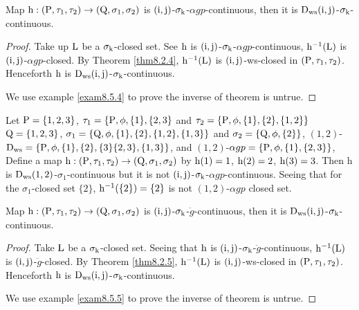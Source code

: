 \begin{thm}\label{thm8.5.4}
Map $\mathrm{h} :(\mathrm{P}, \tau_1, \tau_2 )\to (\mathrm{Q}, \sigma_{1}, \sigma_{2} )$ is $(\mathrm{i}, \mathrm{j})$-$\sigma_{\mathrm{k}}$-$\alpha gp$-continuous, then it is $\mathrm{D}_{\mathrm{ws}} (\mathrm{i}, \mathrm{j})$-$\sigma_{\mathrm{k}}$-continuous.
\end{thm}

\begin{proof}
Take up $\mathrm{L}$ be a $\sigma_{\mathrm{k}}$-closed set. See $\mathrm{h}$ is $(\mathrm{i}, \mathrm{j})$-$\sigma_{\mathrm{k}}$-$\alpha gp$-continuous, $\mathrm{h}^{-1} (\mathrm{L})$ is $(\mathrm{i}, \mathrm{j})$-$\alpha gp$-closed. By Theorem \ref{thm8.2.4}, $\mathrm{h}^{-1} (\mathrm{L})$ is $(\mathrm{i}, \mathrm{j})$-ws-closed in $(\mathrm{P}, \tau_1, \tau_2 )$. Henceforth $\mathrm{h}$ is $\mathrm{D}_{\mathrm{ws}} (\mathrm{i}, \mathrm{j})$-$\sigma_{\mathrm{k}}$-continuous.

We use example \ref{exam8.5.4} to prove the inverse of theorem is untrue.
\end{proof}

\begin{exm}\label{exam8.5.4}
Let $\mathrm{P}=\{1,2,3\}$, $\tau_1 =\{\mathrm{P}, \phi, \{1\},\{2,3\}$ and $\tau_2 =\{\TSP, \phi, \{1\},\{2\},\break \{1,2\}\}$ $\mathrm{Q}=\{1,2,3\}$, $\sigma_{1} =\{\mathrm{Q},\phi,\{1\},\{2\},\{1,2\},\{1,3\}\}$ and $\sigma_{2} =\{\mathrm{Q},\phi, \{2\}\}$, $(1,2)$-$\mathrm{D}_{\mathrm{ws}} =\{\mathrm{P}, \phi, \{1\},\{2\},\{3\}\{2,3\},\{1,3\}\}$, and $(1,2)$-$\alpha gp =\{\mathrm{P}, \phi, \{1\},\{2,3\}\}$, Define a map $\mathrm{h}: (\mathrm{P}, \tau_1, \tau_2 )\to (\mathrm{Q}, \sigma_{1}, \sigma_{2} )$ by $\mathrm{h}(1)=1$, $\mathrm{h}(2)=2$, $\mathrm{h}(3)=3$. Then h is $\mathrm{D}_{\mathrm{ws}} (1, 2)$-$\sigma_{1}$-continuous but it is not $(\mathrm{i}, \mathrm{j})$-$\sigma_{\mathrm{k}}$-$\alpha gp$-continuous. Seeing that for the $\sigma_{1}$-closed set $\{2\}$, $\mathrm{h}^{-1} (\{2\})=\{2\}$ is not $(1, 2)$-$\alpha gp$ closed set.
\end{exm}

\begin{thm}\label{thm8.5.5}
Map $\mathrm{h}:(\mathrm{P}, \tau_1, \tau_2 )\to (\mathrm{Q}, \sigma_{1}, \sigma_{2} )$ is $(\mathrm{i}, \mathrm{j})$-$\sigma_{\mathrm{k}}$-$\ddot{g}$-continuous, then it is $\mathrm{D}_{\mathrm{ws}} (\mathrm{i}, \mathrm{j})$-$\sigma_{\mathrm{k}}$-continuous.
\end{thm}

\begin{proof}
Take $\mathrm{L}$ be a $\sigma_{\mathrm{k}}$-closed set. Seeing that $\mathrm{h}$ is $(\mathrm{i}, \mathrm{j})$-$\sigma_{\mathrm{k}}$-$\ddot{g}$-continuous, $\mathrm{h}^{-1} (\mathrm{L})$ is $(\mathrm{i}, \mathrm{j})$-$\ddot{g}$-closed. By Theorem \ref{thm8.2.5}, $\mathrm{h}^{-1} (\mathrm{L})$ is $(\mathrm{i}, \mathrm{j})$-ws-closed in $(\mathrm{P}, \tau_1, \tau_2 )$. Henceforth $\mathrm{h}$ is $\mathrm{D}_{\mathrm{ws}} (\mathrm{i}, \mathrm{j})$-$\sigma_{\mathrm{k}}$-continuous.

We use example \ref{exam8.5.5} to prove the inverse of theorem is untrue.
\end{proof}

